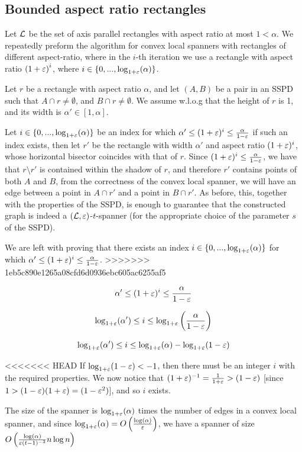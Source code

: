 \documentclass[12pt]{article}%
\begin{document}
\subsection{Bounded aspect ratio rectangles}
Let $\mathcal{L}$ be the set of axis parallel rectangles with aspect ratio at most $1<\alpha$. We repeatedly preform the algorithm for convex local spanners with rectangles of different aspect-ratio, where in the $i$-th iteration we use a rectangle with aspect ratio $\left(1+\varepsilon\right)^i$, where $i\in\{0,...,\log_{1+\varepsilon}(\alpha)\}$. 

Let $r$ be a rectangle with aspect ratio $\alpha$, and let $(A,B)$ be a pair in an SSPD such that $A\cap r\neq \emptyset$, and $B\cap r\neq \emptyset$. We assume w.l.o.g that the height of $r$ is 1, and its width is $\alpha'\in [1,\alpha]$.

Let $i\in \{0,...,\log_{1+\varepsilon}(\alpha)\}$ be an index for which $\alpha' \leq (1+\varepsilon)^i \leq \frac{\alpha}{1-\varepsilon}$ if such an index exists, then let $r'$ be the rectangle with width $\alpha'$ and aspect ratio $(1+\varepsilon)^i$, whose horizontal bisector coincides with that of $r$. Since $(1+\varepsilon)^i \leq \frac{\alpha}{1-\varepsilon}$, we have that $r\setminus r'$ is contained within the shadow of $r$, and therefore $r'$ contains points of both $A$ and $B$, from the correctness of the convex local spanner, we will have an edge between a point in $A\cap r'$ and a point in $B\cap r'$. As before, this, together with the properties of the SSPD, is enough to guarantee that the constructed graph is indeed a $(\mathcal{L}, \varepsilon)$-$t$-spanner (for the appropriate choice of the parameter $s$ of the SSPD).

We are left with proving that there exists an index $i\in \{0,...,\log_{1+\varepsilon}(\alpha)\}$ for which $\alpha' \leq (1+\varepsilon)^i \leq \frac{\alpha}{1-\varepsilon}$.
>>>>>>> 1eb5c890e1265a08cfd6d0936ebc605ac6255af5

$$\alpha' \leq (1+\varepsilon)^i \leq \frac{\alpha}{1-\varepsilon}$$

$$\log_{1+\varepsilon}(\alpha') \leq i \leq \log_{1+\varepsilon}\left(\frac{\alpha}{1-\varepsilon}\right)$$

$$\log_{1+\varepsilon}(\alpha') \leq i \leq \log_{1+\varepsilon}(\alpha) - \log_{1+\varepsilon}(1-\varepsilon)$$

<<<<<<< HEAD
If $\log_{1+\varepsilon}(1-\varepsilon)<-1$, then there must be an integer $i$ with
the required properties. We now notice that
$(1+\varepsilon)^{-1}=\frac{1}{1+\varepsilon}>(1-\varepsilon)$ [since
$1>(1-\varepsilon)(1+\varepsilon)=(1-\varepsilon^2)$], and so $i$ exists.

The size of the spanner is $\log_{1+\varepsilon}(\alpha)$ times the number of
edges in a convex local spanner, and since
$\log_{1+\varepsilon}(\alpha)=O\left(\frac{\log(\alpha)}{\varepsilon}\right)$, we
have a spanner of size
$O\left(\frac{\log(\alpha)}{\varepsilon (t-1)^{-3}}n\log n\right)$
\end{document}
